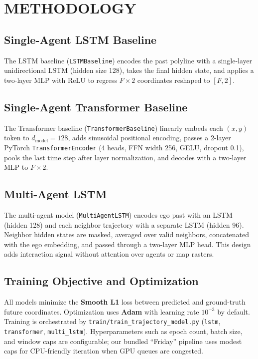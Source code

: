 \documentclass[letterpaper, 10 pt, conference]{ieeeconf}
\begin{document}
\section{METHODOLOGY}

\subsection{Single-Agent LSTM Baseline}

The LSTM baseline (\texttt{LSTMBaseline}) encodes the past polyline with a single-layer unidirectional LSTM (hidden size 128), takes the final hidden state, and applies a two-layer MLP with ReLU to regress $F \times 2$ coordinates reshaped to $[F,2]$.

\subsection{Single-Agent Transformer Baseline}

The Transformer baseline (\texttt{TransformerBaseline}) linearly embeds each $(x,y)$ token to $d_{\mathrm{model}} = 128$, adds sinusoidal positional encoding, passes a 2-layer PyTorch \texttt{TransformerEncoder} (4 heads, FFN width 256, GELU, dropout 0.1), pools the last time step after layer normalization, and decodes with a two-layer MLP to $F \times 2$.

\subsection{Multi-Agent LSTM}

The multi-agent model (\texttt{MultiAgentLSTM}) encodes ego past with an LSTM (hidden 128) and each neighbor trajectory with a separate LSTM (hidden 96). Neighbor hidden states are masked, averaged over valid neighbors, concatenated with the ego embedding, and passed through a two-layer MLP head. This design adds interaction signal without attention over agents or map rasters.

\subsection{Training Objective and Optimization}

All models minimize the \textbf{Smooth L1} loss between predicted and ground-truth future coordinates. Optimization uses \textbf{Adam} with learning rate $10^{-3}$ by default. Training is orchestrated by \texttt{train/train\_trajectory\_model.py} (\texttt{lstm}, \texttt{transformer}, \texttt{multi\_lstm}). Hyperparameters such as epoch count, batch size, and window caps are configurable; our bundled ``Friday'' pipeline uses modest caps for CPU-friendly iteration when GPU queues are congested.
\end{document}
